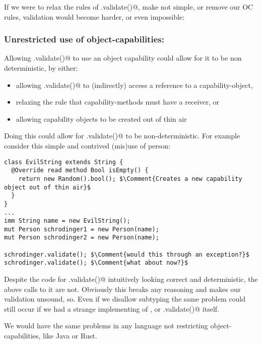 If we were to relax the rules of \Q@.validate()@, make \Q@Person@ not simple, or remove our OC rules, validation would become harder, or even impossible:
\subsubsection*{Unrestricted use of object-capabilities:}
Allowing \Q@.validate()@ to use an object capability could allow for it to be non deterministic, by either:
\begin{itemize}
\item allowing \Q@.validate()@ to (indirectly) access a \Q@mut@ reference to a capability-object,
\item relaxing the rule that capability-methods must have a \Q@mut@ receiver, or
\item allowing capability objects to be created out of thin air
\end{itemize}

Doing this could allow for \Q@.validate()@ to be non-deterministic. For example consider this simple and contrived (mis)use of person:
\begin{lstlisting}
class EvilString extends String {
  @Override read method Bool isEmpty() {
    return new Random().bool(); $\Comment{Creates a new capability object out of thin air}$
  }
}
...
imm String name = new EvilString();
mut Person schrodinger1 = new Person(name);
mut Person schrodinger2 = new Person(name);

schrodinger.validate(); $\Comment{would this through an exception?}$
schrodinger.validate(); $\Comment{what about now?}$
\end{lstlisting}
Despite the code for \Q@Persion.validate()@ intuitively looking correct and deterministic, the above calls to it are not. Obviously this breaks any reasoning and makes our validation unsound, so. Even if we disallow subtyping the same problem could still occur if we had a strange implementing of \Q@String@, or \Q@Persion.validate()@ itself.


We would have the same problems in any language not restricting object-capabilities, like Java or Rust.

